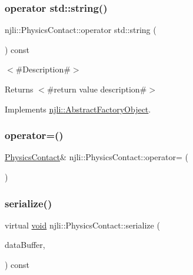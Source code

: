 \subsubsection{\texorpdfstring{operator std\+::string()}{operator std::string()}}
{\footnotesize\ttfamily njli\+::\+Physics\+Contact\+::operator std\+::string (\begin{DoxyParamCaption}{ }\end{DoxyParamCaption}) const\hspace{0.3cm}{\ttfamily [virtual]}}

$<$\#\+Description\#$>$

\begin{DoxyReturn}{Returns}
$<$\#return value description\#$>$ 
\end{DoxyReturn}


Implements \mbox{\hyperlink{classnjli_1_1_abstract_factory_object_a838f4fa7e65cace6098aab5222892942}{njli\+::\+Abstract\+Factory\+Object}}.

\mbox{\label{classnjli_1_1_physics_contact_a7bb830268bd86140800930cdde5c5cc7}} 
\subsubsection{\texorpdfstring{operator=()}{operator=()}}
{\footnotesize\ttfamily \mbox{\hyperlink{classnjli_1_1_physics_contact}{Physics\+Contact}}\& njli\+::\+Physics\+Contact\+::operator= (\begin{DoxyParamCaption}\item[{const \mbox{\hyperlink{classnjli_1_1_physics_contact}{Physics\+Contact}} \&}]{ }\end{DoxyParamCaption})\hspace{0.3cm}{\ttfamily [protected]}}

\mbox{\label{classnjli_1_1_physics_contact_ab69746db04699f604b6d17d13c64a8c5}} 
\subsubsection{\texorpdfstring{serialize()}{serialize()}}
{\footnotesize\ttfamily virtual \mbox{\hyperlink{_thread_8h_af1e856da2e658414cb2456cb6f7ebc66}{void}} njli\+::\+Physics\+Contact\+::serialize (\begin{DoxyParamCaption}\item[{\mbox{\hyperlink{_thread_8h_af1e856da2e658414cb2456cb6f7ebc66}{void}} $\ast$}]{data\+Buffer,  }\item[{bt\+Serializer $\ast$}]{ }\end{DoxyParamCaption}) const\hspace{0.3cm}{\ttfamily [virtual]}}



